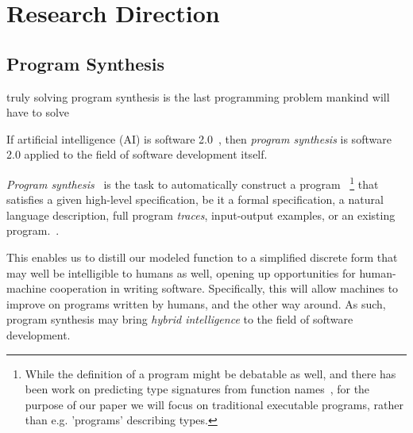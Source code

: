 \documentclass{article}
\begin{document}


\tableofcontents

\pagebreak

\section{Research Direction} %

\subsection{Program Synthesis}

\begin{displayquote}
    truly solving program synthesis is the last programming problem mankind will have to solve~\citep{nps}
\end{displayquote}

\begin{displayquote}
    If artificial intelligence (AI) is software 2.0~\citep{software20},
    then \emph{program synthesis} is software 2.0 applied to the field of software development itself.
\end{displayquote}


\emph{Program synthesis}~\citep{church1957applications} is the task to automatically construct a program%
~\footnote{
    While the definition of a program might be debatable as well,
    and there has been work on predicting type signatures from function names~\citep{wang2018predicting},
    for the purpose of our paper we will focus on traditional executable programs,
    rather than e.g. 'programs' describing types.
}%
that satisfies a given high-level specification,
be it a formal specification, a natural language description,
full program \emph{traces}, input-output examples,
or an existing program.~\citep{gulwani2017program}.

This enables us to distill our modeled function
to a simplified discrete form that may well be intelligible to humans as well,
opening up opportunities for human-machine cooperation in writing software.
Specifically, this will allow machines to improve on programs written by humans, and the other way around.
As such, program synthesis may bring \emph{hybrid intelligence} to the field of software development.
\end{document}
